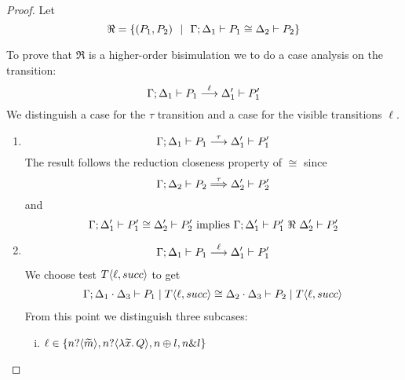 \begin{proof}
	\noi Let
	\[
		\Re = \{(P_1, P_2) \ \ |\ \  \Gamma; \Delta_1 \vdash P_1 \cong \Delta_2 \vdash P_2\}
	\]

	To prove that $\Re$ is a higher-order bisimulation
	we to do a case analysis on the transition:
	\[
		\Gamma; \Delta_1 \vdash P_1 \stackrel{\ell}{\longrightarrow} \Delta_1' \vdash P_1'
	\]
	We distinguish a case for the $\tau$ transition and a case for
	the visible transitions $\ell$.

\begin{enumerate}
	\item
			\[
				\Gamma; \Delta_1 \vdash P_1 \stackrel{\tau}{\longrightarrow} \Delta_1' \vdash P_1'
			\]
			\noi The result follows the reduction closeness property of $\cong$ since
			\[
				\Gamma; \Delta_2 \vdash P_2 \stackrel{\tau}{\Longrightarrow} \Delta_2' \vdash P_2'
			\]
			\noi and
			\[
				\horel{\Gamma}{\Delta_1'}{P_1'}{\cong}{\Delta_2'}{P_2'} \text{ implies } \horel{\Gamma}{\Delta_1'}{P_1'}{\ \Re\ }{\Delta_2'}{P_2'}
			\]

	\item
			\begin{eqnarray}
				\Gamma; \Delta_1 \vdash P_1 \stackrel{\ell}{\longrightarrow} \Delta_1' \vdash P_1'
				\label{lem:cong_is_wb1}
			\end{eqnarray}
			\noi We choose test $T\langle \ell, succ \rangle$ to get
			\begin{eqnarray}
				\Gamma; \Delta_1 \cdot \Delta_3 \vdash P_1 \;|\; T\langle \ell, succ \rangle \cong \Delta_2 \cdot \Delta_3 \vdash P_2 \;|\; T\langle \ell, succ \rangle
				\label{lem:cong_is_wb2}
			\end{eqnarray}
			\noi From this point we distinguish three subcases:

			\begin{enumerate}[i.]
				\item	$\ell \in \{n ? \langle \widetilde{m} \rangle, n ? \langle \lambda \widetilde{x}.\,Q \rangle, n \oplus l, n \& l\}$


\end{enumerate}
\end{enumerate}
\end{proof}
